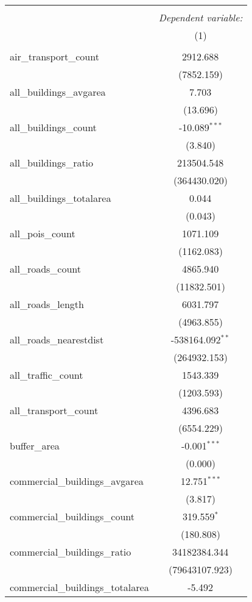 \begin{table}[!htbp] \centering
\begin{tabular}{@{\extracolsep{5pt}}lc}
\\[-1.8ex]\hline
\hline \\[-1.8ex]
& \multicolumn{1}{c}{\textit{Dependent variable:}} \
\cr \cline{1-2}
\\[-1.8ex] & (1) \\
\hline \\[-1.8ex]
 air_transport_count & 2912.688$^{}$ \\
  & (7852.159) \\
 all_buildings_avgarea & 7.703$^{}$ \\
  & (13.696) \\
 all_buildings_count & -10.089$^{***}$ \\
  & (3.840) \\
 all_buildings_ratio & 213504.548$^{}$ \\
  & (364430.020) \\
 all_buildings_totalarea & 0.044$^{}$ \\
  & (0.043) \\
 all_pois_count & 1071.109$^{}$ \\
  & (1162.083) \\
 all_roads_count & 4865.940$^{}$ \\
  & (11832.501) \\
 all_roads_length & 6031.797$^{}$ \\
  & (4963.855) \\
 all_roads_nearestdist & -538164.092$^{**}$ \\
  & (264932.153) \\
 all_traffic_count & 1543.339$^{}$ \\
  & (1203.593) \\
 all_transport_count & 4396.683$^{}$ \\
  & (6554.229) \\
 buffer_area & -0.001$^{***}$ \\
  & (0.000) \\
 commercial_buildings_avgarea & 12.751$^{***}$ \\
  & (3.817) \\
 commercial_buildings_count & 319.559$^{*}$ \\
  & (180.808) \\
 commercial_buildings_ratio & 34182384.344$^{}$ \\
  & (79643107.923) \\
 commercial_buildings_totalarea & -5.492$^{}$ \\

\end{tabular}
\end{table}
